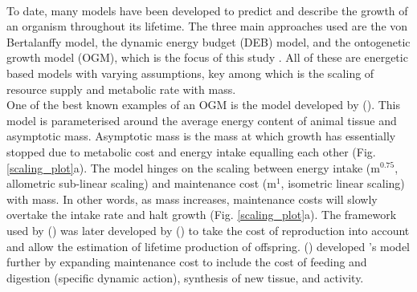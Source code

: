 \documentclass[a4paper, 11pt, hidelinks]{article} %
\begin{document}
	\\
	To date, many models have been developed to predict and describe the growth of an organism throughout its lifetime.  The three main approaches used are the von Bertalanffy model, the dynamic energy budget (DEB) model, and the ontogenetic growth model (OGM), which is the focus of this study \parencite{Putter1918, vonBertalanffy1938, Kooijman1986, West2001}.  All of these are energetic based models with varying assumptions, key among which is the scaling of resource supply and metabolic rate with mass. %
	\\
	One of the best known examples of an OGM is the model developed by \citeauthor{West2001} (\citeyear{West2001}).  This model is parameterised around the average energy content of animal tissue and asymptotic mass.  Asymptotic mass is the mass at which growth has essentially stopped due to metabolic cost and energy intake equalling each other (Fig. \ref{scaling_plot}a). The model hinges on the scaling between energy intake (m$^{0.75}$, allometric sub-linear scaling) and maintenance cost (m$^1$, isometric linear scaling) with mass.  In other words, as mass increases, maintenance costs will slowly overtake the intake rate and halt growth (Fig. \ref{scaling_plot}a).  	
	The framework used by \citeauthor{West2001} (\citeyear{West2001}) was later developed by \citeauthor{Charnov2001} (\citeyear{Charnov2001}) to take the cost of reproduction into account and allow the estimation of lifetime production of offspring.  \citeauthor{Hou2008} (\citeyear{Hou2008})  developed \citeauthor{West2001}'s model further by expanding maintenance cost to include the cost of feeding and digestion (specific dynamic action), synthesis of new tissue, and activity.
\end{document}
